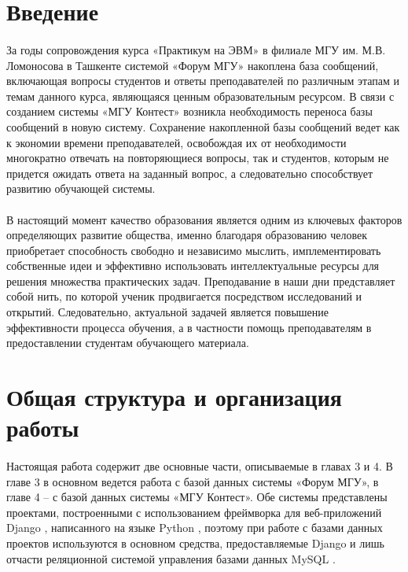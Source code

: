 \documentclass[12pt, a4paper, oneside]{article}
\begin{document}
\tableofcontents
\newpage

\section{Введение}
\paragraph{} %
За годы сопровождения курса «Практикум на ЭВМ» в филиале МГУ им. М.В. Ломоносова в Ташкенте системой «Форум МГУ» накоплена база сообщений, включающая вопросы студентов и ответы преподавателей по различным этапам и темам данного курса, являющаяся ценным образовательным ресурсом. В связи с созданием системы «МГУ Контест» \cite{msu-contest} возникла необходимость переноса базы сообщений в новую систему. Сохранение накопленной базы сообщений ведет как к экономии времени преподавателей, освобождая их от необходимости многократно отвечать на повторяющиеся вопросы, так и студентов, которым не придется ожидать ответа на заданный вопрос, а следовательно способствует развитию обучающей системы.
\paragraph{} %
В настоящий момент качество образования является одним из ключевых факторов определяющих развитие общества, именно благодаря образованию человек приобретает способность свободно и независимо мыслить, имплементировать собственные идеи и эффективно использовать интеллектуальные ресурсы для решения множества практических задач. Преподавание в наши дни представляет собой нить, по которой ученик продвигается посредством исследований и открытий. Следовательно, актуальной задачей является повышение эффективности процесса обучения, а в частности помощь преподавателям в предоставлении студентам обучающего материала.
\newpage

\section{Общая структура и организация работы}
\paragraph{}
Настоящая работа содержит две основные части, описываемые в главах 3 и 4. В главе 3 в основном ведется работа с базой данных системы «Форум МГУ», в главе 4 – с базой данных системы «МГУ Контест». Обе системы представлены проектами, построенными с использованием фреймворка для веб-приложений Django \cite{django}, написанного на языке Python \cite{python}, поэтому при работе с базами данных проектов используются в основном средства, предоставляемые Django и лишь отчасти реляционной системой управления базами данных MySQL \cite{mysql}.
\end{document}

